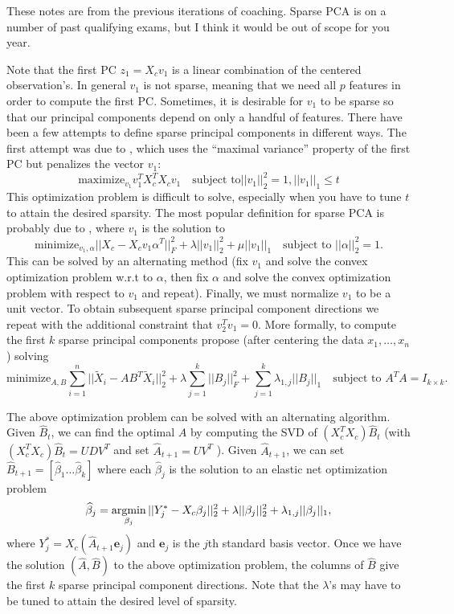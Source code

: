These notes are from the previous iterations of coaching. Sparse PCA is on a number of past qualifying exams, but I think it would be out of scope for you year.

Note that the first PC $z_1 = X_c v_1$ is a linear combination of the centered observation's. In general $v_1$ is not sparse, meaning that we need all $p$ features in order to compute the first PC. Sometimes, it is desirable for $v_1$ to be sparse so that our principal components depend on only a handful of features. There have been a few attempts to define sparse principal components in different ways. The first attempt was due to \cite{Jolliffe2003}, which uses the “maximal variance” property of the first PC but penalizes the vector $v_1$:
$$\text{maximize}_{v_1} v_1^T X_c^T X_c v_1 \quad \text{subject to} \vert \vert v_1 \vert \vert_2^2 =1, \vert \vert v_1 \vert \vert_1 \leq t $$
This optimization problem is difficult to solve, especially when you have to tune $t$ to attain the desired sparsity. The most popular definition for sparse
PCA is probably due to \cite{Zou2006SparsePCA}, where $v_1$ is the solution to
$$\text{minimize}_{v_1,\alpha} \vert \vert X_c - X_cv_1 \alpha^T \vert \vert_F^2 +\lambda \vert \vert v_1 \vert \vert_2^2+\mu \vert \vert v_1 \vert \vert_1 \quad \text{subject to } \vert \vert \alpha \vert \vert_2^2 =1.$$
This can be solved by an alternating method (fix $v_1$ and solve the convex optimization problem w.r.t to $\alpha$, then fix $\alpha$ and solve the convex optimization problem with respect to $v_1$ and repeat). Finally, we must normalize $v_1$ to be a unit vector. To obtain subsequent sparse principal component directions we repeat with the additional constraint that $v_2^T v_1=0$.  More formally, to compute the first $k$ sparse principal components  \cite{Zou2006SparsePCA} propose (after centering the data $x_1,\dots, x_n$) solving $$\text{minimize}_{A,B}  \sum_{i=1}^n \vert \vert \widetilde{X}_i - AB^T \widetilde{X}_i \vert \vert_2^2 + \lambda \sum_{j=1}^k  \vert \vert B_j \vert \vert_F^2+\sum_{j=1}^k \lambda_{1,j} \vert \vert B_j \vert \vert_1 \quad \text{subject to } A^T A =I_{k \times k}.$$

The above optimization problem can be solved with an alternating algorithm. Given $\widehat{B}_t$, we can find the optimal $A$ by computing the SVD  of $(X_c^T X_c)\widehat{B}_t$ (with $(X_c^T X_c)\widehat{B}_t =UDV^T$ and set $\widehat{A}_{t+1} =U V^T$ ). Given $\widehat{A}_{t+1}$, we can set $\widehat{B}_{t+1} = [\widehat{\beta}_1 \dots \widehat{\beta}_k]$ where each $\widehat{\beta}_j$ is the solution to an elastic net optimization problem $$\widehat{\beta}_j = \operatorname*{argmin}\limits_{\beta_j} \vert \vert Y_j^* - X_c \beta_j \vert \vert_2^2 + \lambda \vert \vert \beta_j \vert \vert_2^2 + \lambda_{1,j} \vert \vert \beta_j \vert \vert_1,$$ where $Y_j^* =X_c (\widehat{A}_{t+1} \mathbf{e}_j)$ and $\mathbf{e}_j$ is the $j$th standard basis vector. Once we have the solution $(\widehat{A},\widehat{B})$ to the above optimization problem, the columns of $\widehat{B}$ give the first $k$ sparse principal component directions. Note that the $\lambda$'s may have to be tuned to attain the desired level of sparsity. 



